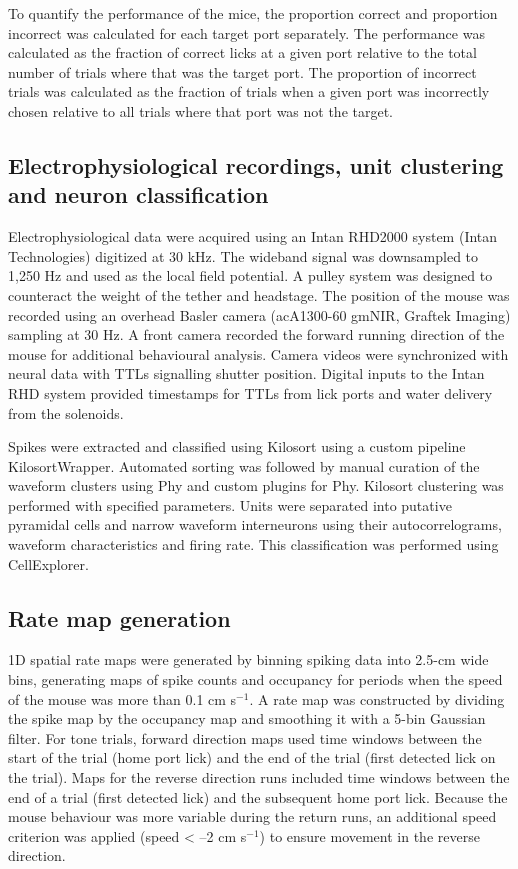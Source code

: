 To quantify the performance of the mice, the proportion correct and proportion incorrect was calculated for each target port separately. The performance was calculated as the fraction of correct licks at a given port relative to the total number of trials where that was the target port. The proportion of incorrect trials was calculated as the fraction of trials when a given port was incorrectly chosen relative to all trials where that port was not the target.

\subsection{Electrophysiological recordings, unit clustering and neuron classification}

Electrophysiological data were acquired using an Intan RHD2000 system (Intan Technologies) digitized at 30 kHz. The wideband signal was downsampled to 1,250 Hz and used as the local field potential. A pulley system was designed to counteract the weight of the tether and headstage. The position of the mouse was recorded using an overhead Basler camera (acA1300-60 gmNIR, Graftek Imaging) sampling at 30 Hz. A front camera recorded the forward running direction of the mouse for additional behavioural analysis. Camera videos were synchronized with neural data with TTLs signalling shutter position. Digital inputs to the Intan RHD system provided timestamps for TTLs from lick ports and water delivery from the solenoids.

Spikes were extracted and classified using Kilosort using a custom pipeline KilosortWrapper. Automated sorting was followed by manual curation of the waveform clusters using Phy and custom plugins for Phy. Kilosort clustering was performed with specified parameters. Units were separated into putative pyramidal cells and narrow waveform interneurons using their autocorrelograms, waveform characteristics and firing rate. This classification was performed using CellExplorer.

\subsection{Rate map generation}

1D spatial rate maps were generated by binning spiking data into 2.5-cm wide bins, generating maps of spike counts and occupancy for periods when the speed of the mouse was more than 0.1 cm s$^{-1}$. A rate map was constructed by dividing the spike map by the occupancy map and smoothing it with a 5-bin Gaussian filter. For tone trials, forward direction maps used time windows between the start of the trial (home port lick) and the end of the trial (first detected lick on the trial). Maps for the reverse direction runs included time windows between the end of a trial (first detected lick) and the subsequent home port lick. Because the mouse behaviour was more variable during the return runs, an additional speed criterion was applied (speed < --2 cm s$^{-1}$) to ensure movement in the reverse direction.

